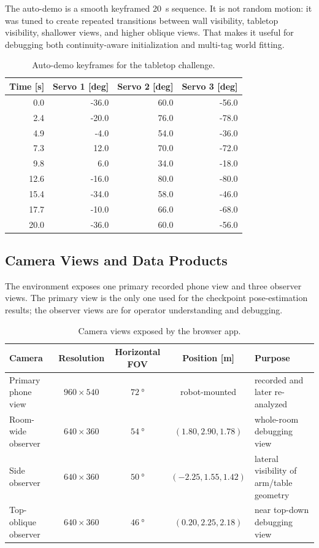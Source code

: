 \documentclass[11pt,a4paper]{article}
\begin{document}
The auto-demo is a smooth keyframed \SI{20}{\second} sequence.
It is not random motion: it was tuned to create repeated transitions between wall visibility, tabletop visibility, shallower views, and higher oblique views.
That makes it useful for debugging both continuity-aware initialization and multi-tag world fitting.

\begin{table}[H]
\centering
\caption{Auto-demo keyframes for the tabletop challenge.}
\label{tab:keyframes}
\begin{tabular}{rrrr}
\toprule
Time [s] & Servo 1 [deg] & Servo 2 [deg] & Servo 3 [deg] \\
\midrule
0.0 & -36.0 & 60.0 & -56.0 \\
2.4 & -20.0 & 76.0 & -78.0 \\
4.9 & -4.0 & 54.0 & -36.0 \\
7.3 & 12.0 & 70.0 & -72.0 \\
9.8 & 6.0 & 34.0 & -18.0 \\
12.6 & -16.0 & 80.0 & -80.0 \\
15.4 & -34.0 & 58.0 & -46.0 \\
17.7 & -10.0 & 66.0 & -68.0 \\
20.0 & -36.0 & 60.0 & -56.0 \\
\bottomrule
\end{tabular}
\end{table}

\subsection{Camera Views and Data Products}

The environment exposes one primary recorded phone view and three observer views.
The primary view is the only one used for the checkpoint pose-estimation results; the observer views are for operator understanding and debugging.

\begin{table}[H]
\centering
\caption{Camera views exposed by the browser app.}
\label{tab:cameras}
\begin{tabularx}{\linewidth}{lcccX}
\toprule
Camera & Resolution & Horizontal FOV & Position [m] & Purpose \\
\midrule
Primary phone view & $960 \times 540$ & $\SI{72}{\degree}$ & robot-mounted & recorded and later re-analyzed \\
Room-wide observer & $640 \times 360$ & $\SI{54}{\degree}$ & $(1.80, 2.90, 1.78)$ & whole-room debugging view \\
Side observer & $640 \times 360$ & $\SI{50}{\degree}$ & $(-2.25, 1.55, 1.42)$ & lateral visibility of arm/table geometry \\
Top-oblique observer & $640 \times 360$ & $\SI{46}{\degree}$ & $(0.20, 2.25, 2.18)$ & near top-down debugging view \\
\bottomrule
\end{tabularx}
\end{table}
\end{document}
